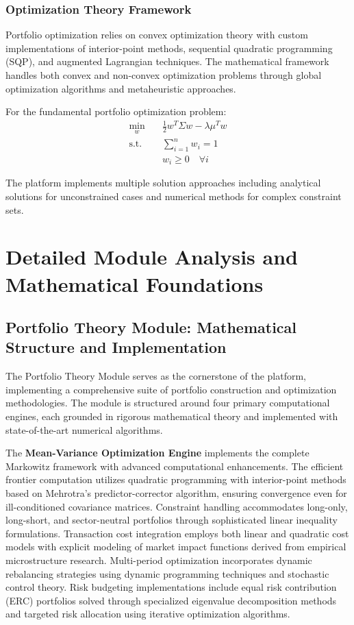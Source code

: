 \documentclass[12pt,a4paper]{article}
\theoremstyle{definition}
\theoremstyle{remark}
\begin{document}
\subsubsection{Optimization Theory Framework}

Portfolio optimization relies on convex optimization theory with custom implementations of interior-point methods, sequential quadratic programming (SQP), and augmented Lagrangian techniques. The mathematical framework handles both convex and non-convex optimization problems through global optimization algorithms and metaheuristic approaches.

For the fundamental portfolio optimization problem:
\begin{align}
\min_{w} \quad & \frac{1}{2}w^T\Sigma w - \lambda \mu^T w \\
\text{s.t.} \quad & \sum_{i=1}^n w_i = 1 \\
& w_i \geq 0 \quad \forall i
\end{align}

The platform implements multiple solution approaches including analytical solutions for unconstrained cases and numerical methods for complex constraint sets.

\section{Detailed Module Analysis and Mathematical Foundations}

\subsection{Portfolio Theory Module: Mathematical Structure and Implementation}

The Portfolio Theory Module serves as the cornerstone of the platform, implementing a comprehensive suite of portfolio construction and optimization methodologies. The module is structured around four primary computational engines, each grounded in rigorous mathematical theory and implemented with state-of-the-art numerical algorithms.

The \textbf{Mean-Variance Optimization Engine} implements the complete Markowitz framework with advanced computational enhancements. The efficient frontier computation utilizes quadratic programming with interior-point methods based on Mehrotra's predictor-corrector algorithm, ensuring convergence even for ill-conditioned covariance matrices. Constraint handling accommodates long-only, long-short, and sector-neutral portfolios through sophisticated linear inequality formulations. Transaction cost integration employs both linear and quadratic cost models with explicit modeling of market impact functions derived from empirical microstructure research. Multi-period optimization incorporates dynamic rebalancing strategies using dynamic programming techniques and stochastic control theory. Risk budgeting implementations include equal risk contribution (ERC) portfolios solved through specialized eigenvalue decomposition methods and targeted risk allocation using iterative optimization algorithms.
\end{document}
